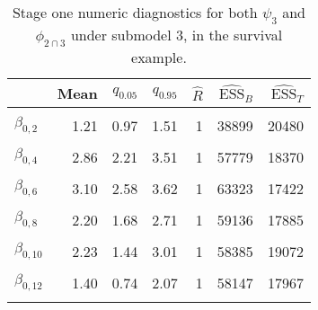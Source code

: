 \begin{table}

\caption{\label{tab:surv-stage-one-submodel-three}Stage one numeric diagnostics for both $\psi_{3}$ and $\phi_{2 \cap 3}$ under submodel 3, in the survival example.}
\centering
\begin{tabular}[t]{lrrrrrr}
\toprule
  & Mean & $q_{0.05}$ & $q_{0.95}$ & $\widehat{R}$ & $\widehat{\text{ESS}}_{B}$ & $\widehat{\text{ESS}}_{T}$\\
\midrule
\cellcolor{gray!6}{$\beta_{0, 1}$} & \cellcolor{gray!6}{2.12} & \cellcolor{gray!6}{1.77} & \cellcolor{gray!6}{2.47} & \cellcolor{gray!6}{1} & \cellcolor{gray!6}{40945} & \cellcolor{gray!6}{17934}\\
$\beta_{0, 2}$ & 1.21 & 0.97 & 1.51 & 1 & 38899 & 20480\\
\cellcolor{gray!6}{$\beta_{0, 3}$} & \cellcolor{gray!6}{3.06} & \cellcolor{gray!6}{2.27} & \cellcolor{gray!6}{3.85} & \cellcolor{gray!6}{1} & \cellcolor{gray!6}{51525} & \cellcolor{gray!6}{18926}\\
$\beta_{0, 4}$ & 2.86 & 2.21 & 3.51 & 1 & 57779 & 18370\\
\cellcolor{gray!6}{$\beta_{0, 5}$} & \cellcolor{gray!6}{0.88} & \cellcolor{gray!6}{0.09} & \cellcolor{gray!6}{1.66} & \cellcolor{gray!6}{1} & \cellcolor{gray!6}{53001} & \cellcolor{gray!6}{18620}\\
$\beta_{0, 6}$ & 3.10 & 2.58 & 3.62 & 1 & 63323 & 17422\\
\cellcolor{gray!6}{$\beta_{0, 7}$} & \cellcolor{gray!6}{0.38} & \cellcolor{gray!6}{-0.41} & \cellcolor{gray!6}{1.19} & \cellcolor{gray!6}{1} & \cellcolor{gray!6}{59141} & \cellcolor{gray!6}{19650}\\
$\beta_{0, 8}$ & 2.20 & 1.68 & 2.71 & 1 & 59136 & 17885\\
\cellcolor{gray!6}{$\beta_{0, 9}$} & \cellcolor{gray!6}{2.48} & \cellcolor{gray!6}{1.83} & \cellcolor{gray!6}{3.13} & \cellcolor{gray!6}{1} & \cellcolor{gray!6}{54187} & \cellcolor{gray!6}{17067}\\
$\beta_{0, 10}$ & 2.23 & 1.44 & 3.01 & 1 & 58385 & 19072\\
\cellcolor{gray!6}{$\beta_{0, 11}$} & \cellcolor{gray!6}{1.88} & \cellcolor{gray!6}{1.22} & \cellcolor{gray!6}{2.54} & \cellcolor{gray!6}{1} & \cellcolor{gray!6}{58546} & \cellcolor{gray!6}{17644}\\
$\beta_{0, 12}$ & 1.40 & 0.74 & 2.07 & 1 & 58147 & 17967\\
\cellcolor{gray!6}{$\beta_{0, 13}$} & \cellcolor{gray!6}{5.24} & \cellcolor{gray!6}{4.64} & \cellcolor{gray!6}{5.82} & \cellcolor{gray!6}{1} & \cellcolor{gray!6}{52880} & \cellcolor{gray!6}{19229}\\

\end{tabular}
\end{table}
